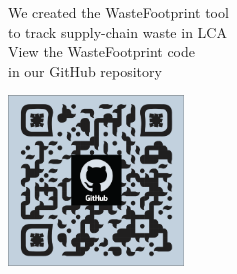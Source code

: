 \documentclass[a0paper,fleqn]{betterposter}
\begin{document}
{{\begin{minipage}{0.50\textwidth}
            \vspace{270pt}
            \begin{center}
            \begin{spacing}{3}
            {\fontsize{46}{20}\selectfont We created the WasteFootprint tool\\to track supply-chain waste in LCA\\}
            \vspace{10pt}
            {\fontsize{36}{40}\selectfont View the WasteFootprint code\\ in our GitHub repository}
            \end{spacing}
            \vspace{30pt}
            \includegraphics[width=0.35\textwidth]{img/qr.svg.eps}
            \end{center}
            \end{minipage}
        \begin{minipage}{0.5\textwidth}
        \begin{flushleft}
            \vspace{220pt}

\end{flushleft}
\end{minipage}}}
\end{document}
